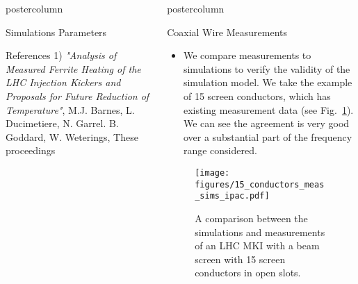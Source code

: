 \documentclass[final,hyperref={pdfpagelabels=false}]{beamer}
\newlength{\columnheight}
\begin{document}
\begin{frame}
\begin{columns}
\begin{column}{.49\textwidth}
\begin{beamercolorbox}[center,wd=\textwidth]{postercolumn}
\begin{minipage}[T]{.95\textwidth}
{\begin{block}{Simulations Parameters}
\begin{itemize}
\end{itemize}

\end{block}
            \vfill

\begin{block}{References}
\small{1) \emph{"Analysis of Measured Ferrite Heating of the LHC Injection Kickers and Proposals for Future Reduction of Temperature"}, M.J. Barnes, L. Ducimetiere, N. Garrel. B. Goddard, W. Weterings, These proceedings}

\end{block}

           \vfill
         \vfill
          }
        \end{minipage}
      \end{beamercolorbox}
    \end{column}

    \begin{column}{.49\textwidth}
      \begin{beamercolorbox}[center,wd=\textwidth]{postercolumn}
        \begin{minipage}[T]{.95\textwidth} %
          \parbox[t][\columnheight]{\textwidth}{ %
\begin{block}{Coaxial Wire Measurements}
\begin{itemize}
\item{We compare measurements to simulations to verify the validity of the simulation model. We take the example of 15 screen conductors, which has existing measurement data (see Fig.~\ref{fig:meas_sim_comp}). We can see the agreement is very good over a substantial part of the frequency range considered.}
\end{itemize}
\begin{figure}
\texttt{[image: figures/15\_conductors\_meas\_sims\_ipac.pdf]}
\caption{A comparison between the simulations and measurements of an LHC MKI with a beam screen with 15 screen conductors in open slots.}
\label{fig:meas_sim_comp}
\end{figure}



\end{block}}
\end{minipage}
\end{beamercolorbox}
\end{column}
\end{columns}
\end{frame}
\end{document}

